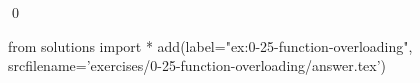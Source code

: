 
\begin{ex}
  \label{ex:0-25-function-overloading}
  
  \qed
\end{ex}
\begin{python0}
from solutions import *
add(label="ex:0-25-function-overloading",
    srcfilename='exercises/0-25-function-overloading/answer.tex')
\end{python0}

